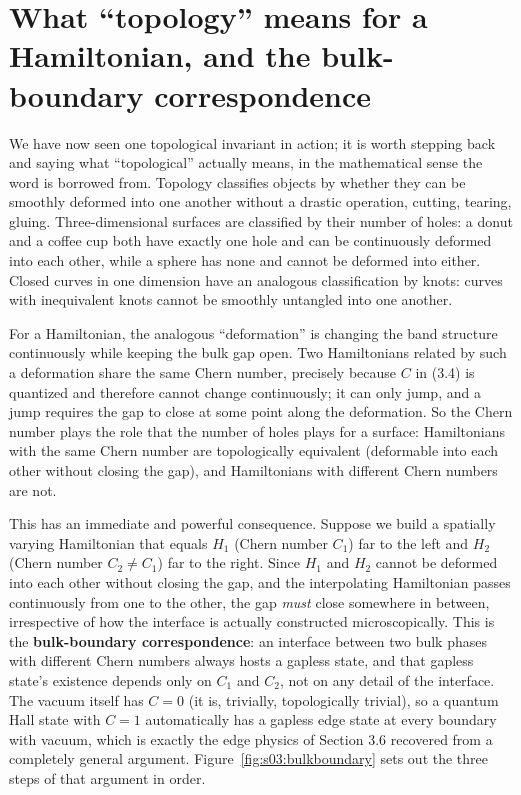 \section{What ``topology'' means for a Hamiltonian, and the bulk-boundary correspondence}

We have now seen one topological invariant in action; it is worth stepping back and saying what
``topological'' actually means, in the mathematical sense the word is borrowed from. Topology
classifies objects by whether they can be smoothly deformed into one another without a drastic
operation, cutting, tearing, gluing. Three-dimensional surfaces are classified by their number of
holes: a donut and a coffee cup both have exactly one hole and can be continuously deformed into each
other, while a sphere has none and cannot be deformed into either. Closed curves in one dimension
have an analogous classification by knots: curves with inequivalent knots cannot be smoothly
untangled into one another.

For a Hamiltonian, the analogous ``deformation'' is changing the band structure continuously while
keeping the bulk gap open. Two Hamiltonians related by such a deformation share the same Chern
number, precisely because $C$ in (3.4) is quantized and therefore cannot change continuously; it can
only jump, and a jump requires the gap to close at some point along the deformation. So the Chern
number plays the role that the number of holes plays for a surface: Hamiltonians with the same Chern
number are topologically equivalent (deformable into each other without closing the gap), and
Hamiltonians with different Chern numbers are not.

This has an immediate and powerful consequence. Suppose we build a spatially varying Hamiltonian that
equals $H_1$ (Chern number $C_1$) far to the left and $H_2$ (Chern number $C_2 \neq C_1$) far to the
right. Since $H_1$ and $H_2$ cannot be deformed into each other without closing the gap, and the
interpolating Hamiltonian passes continuously from one to the other, the gap \emph{must} close somewhere
in between, irrespective of how the interface is actually constructed microscopically. This is the
\textbf{bulk-boundary correspondence}: an interface between two bulk phases with different Chern numbers
always hosts a gapless state, and that gapless state's existence depends only on $C_1$ and $C_2$, not
on any detail of the interface. The vacuum itself has $C=0$ (it is, trivially, topologically trivial),
so a quantum Hall state with $C=1$ automatically has a gapless edge state at every boundary with
vacuum, which is exactly the edge physics of Section 3.6 recovered from a completely general argument.
Figure~\ref{fig:s03:bulkboundary} sets out the three steps of that argument in order.

